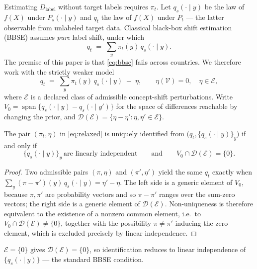 Estimating $D_{\mathrm{label}}$ without target labels requires $\pi_t$.  Let
$q_s(\cdot\mid y)$ be the law of $f(X)$ under $P_s(\cdot\mid y)$ and $q_t$ the
law of $f(X)$ under $P_t$ --- the latter observable from unlabeled target data.
Classical black-box shift estimation (BBSE) assumes \emph{pure} label shift,
under which
\begin{equation}\label{eq:bbse}
  q_t \;=\; \textstyle\sum_y \pi_t(y)\, q_s(\cdot\mid y).
\end{equation}
The premise of this paper is that \eqref{eq:bbse} fails across countries.  We
therefore work with the strictly weaker model
\begin{equation}\label{eq:relaxed}
  q_t \;=\; \textstyle\sum_y \pi_t(y)\, q_s(\cdot\mid y) \;+\; \eta,
  \qquad \eta(\mathcal{V})=0,\quad \eta\in\mathcal{E},
\end{equation}
where $\mathcal{E}$ is a declared class of admissible concept-shift
perturbations.  Write
$V_0=\operatorname{span}\{q_s(\cdot\mid y)-q_s(\cdot\mid y')\}$ for the space
of differences reachable by changing the prior, and
$\mathcal{D}(\mathcal{E})=\{\eta-\eta':\eta,\eta'\in\mathcal{E}\}$.

\begin{theorem}[Identification]\label{thm:ident}
The pair $(\pi_t,\eta)$ in \eqref{eq:relaxed} is uniquely identified from
$\big(q_t,\{q_s(\cdot\mid y)\}_y\big)$ if and only if
\[
  \{q_s(\cdot\mid y)\}_{y}\ \text{are linearly independent}
  \qquad\text{and}\qquad
  V_0\cap\mathcal{D}(\mathcal{E})=\{0\}.
\]
\end{theorem}

\begin{proof}
Two admissible pairs $(\pi,\eta)$ and $(\pi',\eta')$ yield the same $q_t$
exactly when $\sum_y(\pi-\pi')(y)\,q_s(\cdot\mid y)=\eta'-\eta$.  The left side
is a generic element of $V_0$, because $\pi,\pi'$ are probability vectors and
so $\pi-\pi'$ ranges over the sum-zero vectors; the right side is a generic
element of $\mathcal{D}(\mathcal{E})$.  Non-uniqueness is therefore equivalent
to the existence of a nonzero common element, i.e.\ to
$V_0\cap\mathcal{D}(\mathcal{E})\neq\{0\}$, together with the possibility
$\pi\neq\pi'$ inducing the zero element, which is excluded precisely by linear
independence.
\end{proof}

\begin{corollary}
$\mathcal{E}=\{0\}$ gives $\mathcal{D}(\mathcal{E})=\{0\}$, so identification
reduces to linear independence of $\{q_s(\cdot\mid y)\}$ --- the standard BBSE
condition.
\end{corollary}

